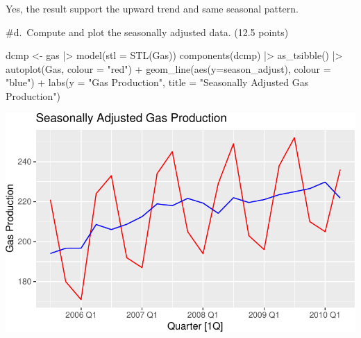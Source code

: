\documentclass[
  letterpaper,
  DIV=11,
  numbers=noendperiod]{scrartcl}
\newenvironment{Shaded}{\begin{snugshade}}{\end{snugshade}}
\newcommand{\AttributeTok}[1]{\textcolor[rgb]{0.40,0.45,0.13}{#1}}
\newcommand{\FunctionTok}[1]{\textcolor[rgb]{0.28,0.35,0.67}{#1}}
\newcommand{\NormalTok}[1]{\textcolor[rgb]{0.00,0.23,0.31}{#1}}
\newcommand{\OtherTok}[1]{\textcolor[rgb]{0.00,0.23,0.31}{#1}}
\newcommand{\SpecialCharTok}[1]{\textcolor[rgb]{0.37,0.37,0.37}{#1}}
\newcommand{\StringTok}[1]{\textcolor[rgb]{0.13,0.47,0.30}{#1}}
\begin{document}
Yes, the result support the upward trend and same seasonal pattern.

\#d.~Compute and plot the seasonally adjusted data. (12.5 points)

\begin{Shaded}
\begin{Highlighting}[]
\NormalTok{dcmp }\OtherTok{\textless{}{-}}\NormalTok{ gas }\SpecialCharTok{|\textgreater{}}
    \FunctionTok{model}\NormalTok{(}\AttributeTok{stl =} \FunctionTok{STL}\NormalTok{(Gas))}
 \FunctionTok{components}\NormalTok{(dcmp) }\SpecialCharTok{|\textgreater{}}
    \FunctionTok{as\_tsibble}\NormalTok{() }\SpecialCharTok{|\textgreater{}}
    \FunctionTok{autoplot}\NormalTok{(Gas, }\AttributeTok{colour =} \StringTok{"red"}\NormalTok{) }\SpecialCharTok{+}
   \FunctionTok{geom\_line}\NormalTok{(}\FunctionTok{aes}\NormalTok{(}\AttributeTok{y=}\NormalTok{season\_adjust), }\AttributeTok{colour =} \StringTok{"blue"}\NormalTok{) }\SpecialCharTok{+}
     \FunctionTok{labs}\NormalTok{(}\AttributeTok{y =} \StringTok{"Gas Production"}\NormalTok{,}
         \AttributeTok{title =} \StringTok{"Seasonally Adjusted Gas Production"}\NormalTok{)}
\end{Highlighting}
\end{Shaded}

\includegraphics{HW2_IBM6520_files/figure-pdf/unnamed-chunk-8-1.pdf}
\end{document}
